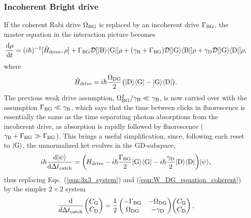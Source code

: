 \documentclass[
						superscriptaddress, 																 amsmath, amssymb,
		 aps,  prb,  
										floatfix,
		linenumbers,
			]{revtex4-1}
\begin{document}
\subsubsection{Incoherent Bright drive} 
\label{sec:incoherent-B-drive}
If the coherent Rabi drive $\Omega_{\rm BG}$ is replaced by an incoherent drive $\Gamma_{\rm BG}$, the master equation in the interaction picture becomes
\begin{equation}
\frac{\mathrm{d}\rho}{\mathrm{d}t}=(i\hbar)^{-1}[\hat H_{\rm drive},\rho]+\Gamma_{\rm BG}{\cal D}[|{\rm B}\rangle\langle{\rm G}|]\rho+(\gamma_{\rm B}+\Gamma_{\rm BG}){\cal D}[|{\rm G}\rangle\langle{\rm B}|]\rho+\gamma_{\rm D}{\cal D}[|{\rm G}\rangle\langle{\rm D}|]\rho,
\end{equation}
where
\begin{equation}
\hat H_{\rm drive}=i\hbar\frac{\Omega_{\rm DG}}2\big(|{\rm D}\rangle\langle{\rm G}|-|{\rm G}\rangle\langle{\rm D}|\big).
\end{equation}
The previous weak drive assumption, $\Omega_{\rm BG}^2/\gamma_{\rm B}\ll\gamma_{\rm B}$, is now carried over with the assumption $\Gamma_{\rm BG}\ll\gamma_{\rm B}$, which says that the time between clicks in fluorescence is essentially the same as the time separating photon absorptions from the incoherent drive, as absorption is rapidly followed by fluorescence ($\gamma_{\rm B}+\Gamma_{\rm BG}\gg\Gamma_{\rm BG}$). This brings a useful simplification, since, following each reset to $|{\rm G}\rangle$, the unnormalized ket evolves in the GD-subspace,
\begin{equation}
i\hbar\frac{\mathrm{d}|\psi\rangle}{\mathrm{d}\Delta t_{\rm catch}}=\left(\mkern-2mu H_{\rm drive}-i\hbar\frac{\Gamma_{\rm BG}}2|{\rm G}\rangle\langle{\rm G}|-i\hbar\frac{\gamma_{\rm D}}2|{\rm D}\rangle\langle{\rm D}|\right)\mkern-3mu|\psi\rangle,
\end{equation}
thus replacing Eqs.~(\ref{eqn:3x3_system}) and (\ref{eqn:W_DG_equation_coherent}) by the simpler $2\times2$ system
\begin{equation}
\frac{\mathrm{d}}{d\Delta t_{\rm catch}}\mkern-2mu\left(
\begin{matrix}
C_{\rm G}\\
C_{\rm D}
\end{matrix}
\right)=\frac12\left(
\begin{matrix}
-\Gamma_{\rm BG}&-\Omega_{\rm DG}\\

\Omega_{\rm DG}&-\gamma_{\rm D}\\
\end{matrix}
\right)\mkern-4mu\left(
\begin{matrix}
C_{\rm G}\\
C_{\rm D}
\end{matrix}
\right),
\end{equation}
\end{document}
